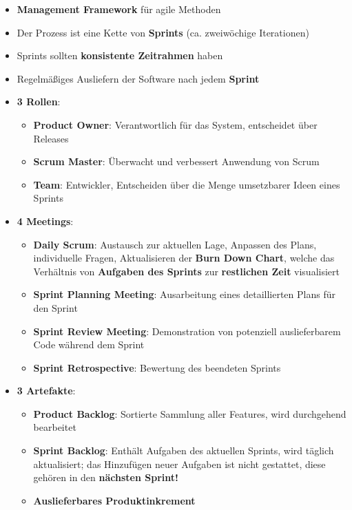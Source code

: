 \begin{itemize}
	\item \textbf{Management Framework} für agile Methoden
	\item Der Prozess ist eine Kette von \textbf{Sprints} (ca. zweiwöchige Iterationen)
	\item Sprints sollten \textbf{konsistente Zeitrahmen} haben
	\item Regelmäßiges Ausliefern der Software nach jedem \textbf{Sprint}
	\item \textbf{3 Rollen}:
	\begin{itemize}
		\item \textbf{Product Owner}: Verantwortlich für das System, entscheidet über Releases
		\item \textbf{Scrum Master}: Überwacht und verbessert Anwendung von Scrum
		\item \textbf{Team}: Entwickler, Entscheiden über die Menge umsetzbarer Ideen eines Sprints
	\end{itemize}
	\item \textbf{4 Meetings}:
	\begin{itemize}
		\item \textbf{Daily Scrum}: Austausch zur aktuellen Lage, Anpassen des Plans, individuelle Fragen, Aktualisieren der \textbf{Burn Down Chart}, welche das Verhältnis von \textbf{Aufgaben des Sprints} zur \textbf{restlichen Zeit} visualisiert
		\item \textbf{Sprint Planning Meeting}: Ausarbeitung eines detaillierten Plans für den Sprint
		\item \textbf{Sprint Review Meeting}: Demonstration von potenziell auslieferbarem Code während dem Sprint
		\item \textbf{Sprint Retrospective}: Bewertung des beendeten Sprints
	\end{itemize}
	\item \textbf{3 Artefakte}:
	\begin{itemize}
		\item \textbf{Product Backlog}: Sortierte Sammlung aller Features, wird durchgehend bearbeitet
		\item \textbf{Sprint Backlog}: Enthält Aufgaben des aktuellen Sprints, wird täglich aktualisiert; das Hinzufügen neuer Aufgaben ist nicht gestattet, diese gehören in den \textbf{nächsten Sprint!}
		\item \textbf{Auslieferbares Produktinkrement}
	\end{itemize}
\end{itemize}
